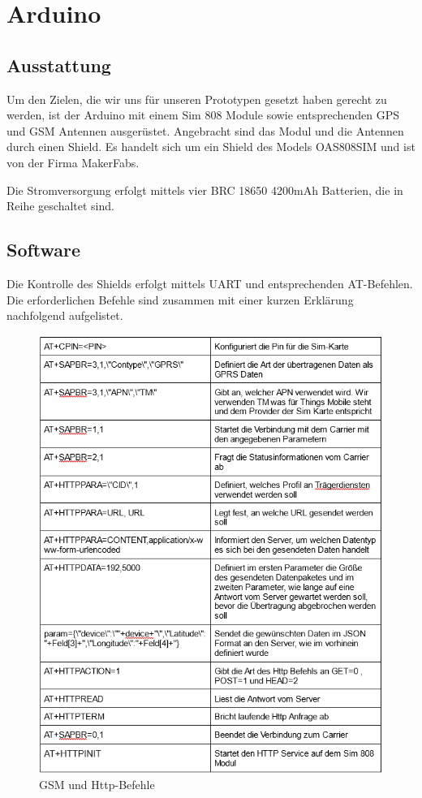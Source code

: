 \section{Arduino}
\subsection{Ausstattung}
Um den Zielen, die wir uns für unseren Prototypen gesetzt haben gerecht zu werden, ist der Arduino mit einem Sim 808 Module sowie entsprechenden GPS und GSM Antennen ausgerüstet.
Angebracht sind das Modul und die Antennen durch einen Shield. Es handelt sich um ein Shield des Models OAS808SIM und ist von der Firma MakerFabs.

Die Stromversorgung erfolgt mittels vier BRC 18650 4200mAh Batterien, die in Reihe geschaltet sind. 

\subsection{Software}
Die Kontrolle des Shields erfolgt mittels UART und entsprechenden AT-Befehlen. Die erforderlichen Befehle sind zusammen mit einer kurzen Erklärung nachfolgend aufgelistet.

\begin{figure} [H]
 \begin{center}
		\includegraphics[width=1\textwidth]{Bilder/Arduino_Befehlstabelle_1.png}
		\caption{GSM und Http-Befehle}
		\label{Gsm_http}
	\end{center}
\end{figure}

